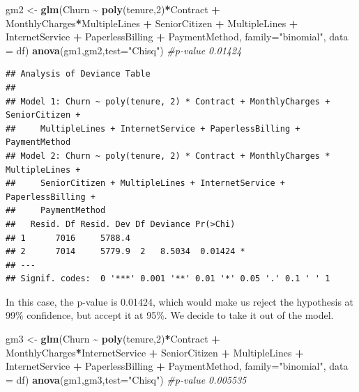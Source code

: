\documentclass[
]{article}
\newenvironment{Shaded}{\begin{snugshade}}{\end{snugshade}}
\newcommand{\AttributeTok}[1]{\textcolor[rgb]{0.13,0.29,0.53}{#1}}
\newcommand{\CommentTok}[1]{\textcolor[rgb]{0.56,0.35,0.01}{\textit{#1}}}
\newcommand{\DecValTok}[1]{\textcolor[rgb]{0.00,0.00,0.81}{#1}}
\newcommand{\FunctionTok}[1]{\textcolor[rgb]{0.13,0.29,0.53}{\textbf{#1}}}
\newcommand{\NormalTok}[1]{#1}
\newcommand{\OtherTok}[1]{\textcolor[rgb]{0.56,0.35,0.01}{#1}}
\newcommand{\SpecialCharTok}[1]{\textcolor[rgb]{0.81,0.36,0.00}{\textbf{#1}}}
\newcommand{\StringTok}[1]{\textcolor[rgb]{0.31,0.60,0.02}{#1}}
\begin{document}
\begin{Shaded}
\begin{Highlighting}[]
\NormalTok{gm2 }\OtherTok{\textless{}{-}} \FunctionTok{glm}\NormalTok{(Churn }\SpecialCharTok{\textasciitilde{}} \FunctionTok{poly}\NormalTok{(tenure,}\DecValTok{2}\NormalTok{)}\SpecialCharTok{*}\NormalTok{Contract }\SpecialCharTok{+}\NormalTok{ MonthlyCharges}\SpecialCharTok{*}\NormalTok{MultipleLines }\SpecialCharTok{+}\NormalTok{ SeniorCitizen }\SpecialCharTok{+}\NormalTok{ MultipleLines }\SpecialCharTok{+}\NormalTok{ InternetService }\SpecialCharTok{+}\NormalTok{ PaperlessBilling }\SpecialCharTok{+}\NormalTok{ PaymentMethod, }\AttributeTok{family=}\StringTok{"binomial"}\NormalTok{, }\AttributeTok{data =}\NormalTok{ df)}
\FunctionTok{anova}\NormalTok{(gm1,gm2,}\AttributeTok{test=}\StringTok{"Chisq"}\NormalTok{) }\CommentTok{\#p{-}value 0.01424 }
\end{Highlighting}
\end{Shaded}

\begin{verbatim}
## Analysis of Deviance Table
## 
## Model 1: Churn ~ poly(tenure, 2) * Contract + MonthlyCharges + SeniorCitizen + 
##     MultipleLines + InternetService + PaperlessBilling + PaymentMethod
## Model 2: Churn ~ poly(tenure, 2) * Contract + MonthlyCharges * MultipleLines + 
##     SeniorCitizen + MultipleLines + InternetService + PaperlessBilling + 
##     PaymentMethod
##   Resid. Df Resid. Dev Df Deviance Pr(>Chi)  
## 1      7016     5788.4                       
## 2      7014     5779.9  2   8.5034  0.01424 *
## ---
## Signif. codes:  0 '***' 0.001 '**' 0.01 '*' 0.05 '.' 0.1 ' ' 1
\end{verbatim}

In this case, the p-value is 0.01424, which would make us reject the
hypothesis at 99\% confidence, but accept it at 95\%. We decide to take
it out of the model.

\begin{Shaded}
\begin{Highlighting}[]
\NormalTok{gm3 }\OtherTok{\textless{}{-}} \FunctionTok{glm}\NormalTok{(Churn }\SpecialCharTok{\textasciitilde{}} \FunctionTok{poly}\NormalTok{(tenure,}\DecValTok{2}\NormalTok{)}\SpecialCharTok{*}\NormalTok{Contract }\SpecialCharTok{+}\NormalTok{ MonthlyCharges}\SpecialCharTok{*}\NormalTok{InternetService }\SpecialCharTok{+}\NormalTok{ SeniorCitizen }\SpecialCharTok{+}\NormalTok{ MultipleLines }\SpecialCharTok{+}\NormalTok{ InternetService }\SpecialCharTok{+}\NormalTok{ PaperlessBilling }\SpecialCharTok{+}\NormalTok{ PaymentMethod, }\AttributeTok{family=}\StringTok{"binomial"}\NormalTok{, }\AttributeTok{data =}\NormalTok{ df)}
\FunctionTok{anova}\NormalTok{(gm1,gm3,}\AttributeTok{test=}\StringTok{"Chisq"}\NormalTok{) }\CommentTok{\#p{-}value 0.005535  }
\end{Highlighting}
\end{Shaded}
\end{document}
